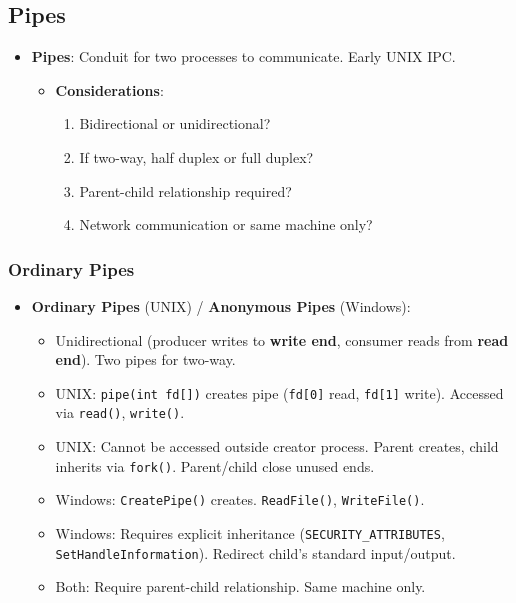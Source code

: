 \subsection{Pipes}
\begin{itemize}
    \item \textbf{Pipes}: Conduit for two processes to communicate. Early UNIX IPC.
        \begin{itemize}
            \item \textbf{Considerations}:
                \begin{enumerate}
                    \item Bidirectional or unidirectional?
                    \item If two-way, half duplex or full duplex?
                    \item Parent-child relationship required?
                    \item Network communication or same machine only?
                \end{enumerate}
        \end{itemize}
\end{itemize}

\subsubsection{Ordinary Pipes}
\begin{itemize}
            \item \textbf{Ordinary Pipes} (UNIX) / \textbf{Anonymous Pipes} (Windows):
                \begin{itemize}
                    \item Unidirectional (producer writes to \textbf{write end}, consumer reads from \textbf{read end}). Two pipes for two-way.
                    \item UNIX: \texttt{pipe(int fd[])} creates pipe (\texttt{fd[0]} read, \texttt{fd[1]} write). Accessed via \texttt{read()}, \texttt{write()}.
                    \item UNIX: Cannot be accessed outside creator process. Parent creates, child inherits via \texttt{fork()}. Parent/child close unused ends.
                    \item Windows: \texttt{CreatePipe()} creates. \texttt{ReadFile()}, \texttt{WriteFile()}.
                    \item Windows: Requires explicit inheritance (\texttt{SECURITY\_ATTRIBUTES}, \texttt{SetHandleInformation}). Redirect child's standard input/output.
                    \item Both: Require parent-child relationship. Same machine only.
                \end{itemize}
\end{itemize}

